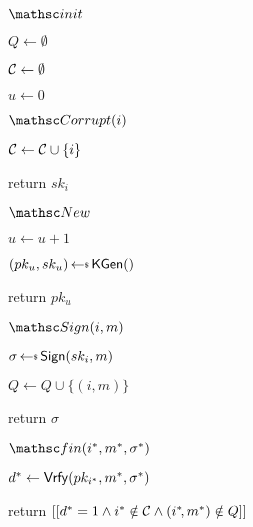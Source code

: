 \iffull
\begin{figure}[t]
	\centering
	
	\begin{minipage}[t]{0.2\textwidth}
		\NewExperiment[$\Gm^{\muEUFCMA}_{\SIGScheme,\advA}$]
		
		\begin{oracle}{$\Initialize$}
			\item $Q \gets \emptyset$
			\item $\mathcal{C} \gets \emptyset$
			\item $u \gets 0$
		\end{oracle}
		\ExptSepSpace
			\begin{oracle}{$\Corrupt(i)$}
			\item $\mathcal{C} \gets \mathcal{C} \cup \{i\}$
			\item return $sk_i$
		\end{oracle}
	\end{minipage}
	\begin{minipage}[t]{0.3\textwidth}
		\vspace*{\iffull0.4cm\else0cm\fi}

		\begin{oracle}{$\New$}
			\item $u \gets u + 1$
			\item $(pk_u, sk_u) \getsr \SIGKGen()$
			\item return $pk_u$
		\end{oracle}		
		\ExptSepSpace
		\begin{oracle}{$\OSign(i, m)$}
			\item $\sigma \getsr \SIGSign(sk_i, m)$
			\item $Q \gets Q \cup \{(i, m)\}$
			\item return $\sigma$
		\end{oracle}
		
	\end{minipage}
	\begin{minipage}[t]{0.47\textwidth}
		\vspace*{.4cm}
		
		\begin{oracle}{$\Finalize(i^*, m^*, \sigma^*)$}
			\item $d^* \gets \mathsf{Vrfy}(pk_{i^*}, m^*, \sigma^*)$
			\item return $[[ d^* = 1 \land i^* \notin \mathcal{C} \land (i^*\!, m^*) \notin Q ]]$
		\end{oracle}
	\end{minipage}
	

\end{figure}
